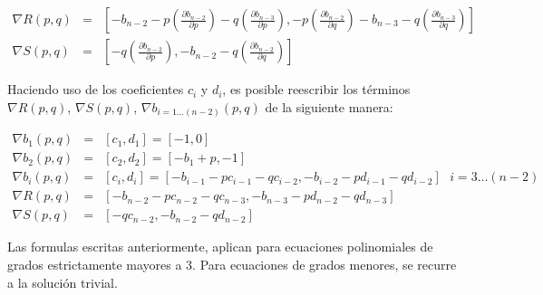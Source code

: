 \documentclass[11pt, spanish]{article}
\begin{document}
\begin{eqnarray*}
\nabla R(p, q) & = & \left[ -b_{n-2} - p \left( \frac{\partial b_{n-2}}{\partial p} \right) - q \left( \frac{\partial b_{n-3}}{\partial p} \right),  -p \left( \frac{\partial b_{n-2}}{\partial q}\right) -b_{n-3}  - q \left( \frac{\partial b_{n-3}}{\partial q} \right)\right] \\
\nabla S(p, q) & = & \left[- q \left( \frac{\partial b_{n-2}}{\partial p} \right) , -b_{n-2}  - q \left( \frac{\partial b_{n-2}}{\partial q} \right)\right] 
\end{eqnarray*}

Haciendo uso de los coeficientes $c_i$ y $d_i$, es posible reescribir los términos $\nabla R(p, q)$, $\nabla S(p, q)$,  $\nabla b_{i = 1 \dots (n - 2)}(p, q)$ de la siguiente manera:

\begin{eqnarray*}
\nabla b_{1}(p, q) & = & \left[ c_1, d_1 \right] = \left[ -1, 0 \right] \\
\nabla b_{2}(p, q) & = & \left[ c_2, d_2 \right] =  \left[ -b_1 + p, -1 \right]\\
\nabla b_{i}(p, q) & = & \left[ c_i, d_i \right] = \left[ -b_{i-1} - p c_{i-1} - q c_{i-2}, -b_{i-2} - p d_{i-1} - q d_{i-2} \right]\ \ \ i = 3 \dots (n - 2) \\
\nabla R(p, q) & = & \left[-b_{n-2} - p c_{n-2} - qc_{n-3}, -b_{n-3} - pd_{n-2}-qd_{n-3}\right] \\
\nabla S(p, q) & = & \left[-qc_{n-2}, -b_{n-2}-q d_{n-2}\right]
\end{eqnarray*}

Las formulas escritas anteriormente, aplican para ecuaciones polinomiales de grados estrictamente mayores a 3. Para ecuaciones de grados menores, se recurre a la solución trivial.
\end{document}
